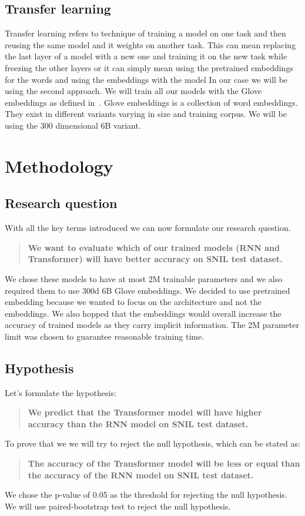 \documentclass{article}
\begin{document}
    \subsection{Transfer learning}
    Transfer learning refers to technique of training a model on one task and then reusing the same model and it weights on another task.
    This can mean replacing the last layer of a model with a new one and training it on the new task while freezing the other layers or it can simply mean using the pretrained embeddings for the words and using the embeddings with the model
    In our case we will be using the second approach. We will train all our models with the Glove embeddings as defined in~\cite{penningtonGloVeGlobalVectors2014}.
    Glove embeddings is a collection of word embeddings.
    They exist in different variants varying in size and training corpus.
    We will be using the 300 dimensional 6B variant.


    \section{Methodology}
        \subsection{Research question}
        With all the key terms introduced we can now formulate our research question.
        \begin{quote}
            \textbf{We want to evaluate which of our trained models (RNN and Transformer) will have better accuracy on SNIL test dataset.}
        \end{quote}
        We chose these models to have at most 2M trainable parameters and we also required them to use 300d 6B Glove embeddings.
        We decided to use pretrained embedding because we wanted to focus on the architecture and not the embeddings. We also hopped that the embeddings would overall increase the accuracy of trained models as they carry implicit information.
        The 2M parameter limit was chosen to guarantee reasonable training time.

        \subsection{Hypothesis}
        Let's formulate the hypothesis:
        \begin{quote}
            \textbf{We predict that the Transformer model will have higher accuracy than the RNN model on SNIL test dataset.}
        \end{quote}
        To prove that we we will try to reject the null hypothesis, which can be stated as:
        \begin{quote}
            \textbf{The accuracy of the Transformer model will be less or equal than the accuracy of the RNN model on SNIL test dataset.}
        \end{quote}
        We chose the p-value of 0.05 as the threshold for rejecting the null hypothesis.
        We will use paired-bootstrap test to reject the null hypothesis.
\end{document}
